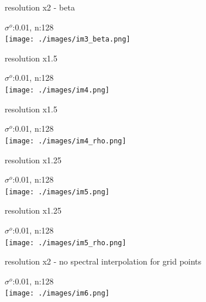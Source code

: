\documentclass[francais]{beamer}
\begin{document}
\begin{frame}{resolution x2 - beta}
\begin{center}
$\sigma^o$:0.01, n:128\\
 \texttt{[image: ./images/im3\_beta.png]}
\end{center}
\end{frame}







\begin{frame}{resolution x1.5}
\begin{center}
$\sigma^o$:0.01, n:128\\
 \texttt{[image: ./images/im4.png]}
\end{center}
\end{frame}


\begin{frame}{resolution x1.5}
\begin{center}
$\sigma^o$:0.01, n:128\\
 \texttt{[image: ./images/im4\_rho.png]}
\end{center}
\end{frame}





\begin{frame}{resolution x1.25}
\begin{center}
$\sigma^o$:0.01, n:128\\
 \texttt{[image: ./images/im5.png]}
\end{center}
\end{frame}


\begin{frame}{resolution x1.25}
\begin{center}
$\sigma^o$:0.01, n:128\\
 \texttt{[image: ./images/im5\_rho.png]}
\end{center}
\end{frame}



\begin{frame}{resolution x2 - no spectral interpolation for grid points}
\begin{center}
$\sigma^o$:0.01, n:128\\
 \texttt{[image: ./images/im6.png]}
\end{center}
\end{frame}
\end{document}
